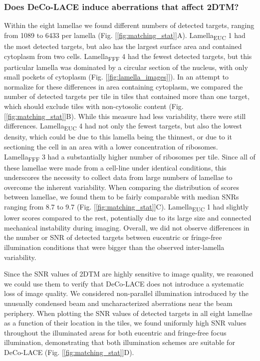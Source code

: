 \documentclass[
]{article}
\begin{document}
\hypertarget{does-deco-lace-induce-aberrations-that-affect-2dtm}{%
\subsubsection{Does DeCo-LACE induce aberrations that affect 2DTM?}\label{does-deco-lace-induce-aberrations-that-affect-2dtm}}

Within the eight lamellae we found different numbers of detected
targets, ranging from 1089 to 6433 per lamella (Fig.
{[}\ref{fig:matching_stat}{]}A). Lamella\textsubscript{EUC} 1 had the most detected targets,
but also has the largest surface area and contained cytoplasm from two
cells. Lamella\textsubscript{FFF} 4 had the fewest detected targets, but this
particular lamella was dominated by a circular section of the nucleus,
with only small pockets of cytoplasm (Fig. {[}\ref{fig:lamella_images}{]}). In an
attempt to normalize for these differences in area containing cytoplasm,
we compared the number of detected targets per tile in tiles that
contained more than one target, which should exclude tiles with
non-cytosolic content (Fig. {[}\ref{fig:matching_stat}{]}B). While this measure
had less variability, there were still differences. Lamella\textsubscript{EUC} 4 had
not only the fewest targets, but also the lowest density, which could be
due to this lamella being the thinnest, or due to it sectioning the cell
in an area with a lower concentration of ribosomes. Lamella\textsubscript{FFF} 3 had a
substantially higher number of ribosomes per tile. Since all of these
lamellae were made from a cell-line under identical conditions, this
underscores the necessity to collect data from large numbers of lamellae
to overcome the inherent variability. When comparing the distribution of
scores between lamellae, we found them to be fairly comparable with
median SNRs ranging from 8.7 to 9.7 (Fig. {[}\ref{fig:matching_stat}{]}C).
Lamella\textsubscript{EUC} 1 had slightly lower scores compared to the rest,
potentially due to its large size and connected mechanical instability
during imaging. Overall, we did not observe differences in the number or
SNR of detected targets between eucentric or fringe-free illumination
conditions that were bigger than the observed inter-lamella variability.

Since the SNR values of 2DTM are highly sensitive to image quality, we
reasoned we could use them to verify that DeCo-LACE does not introduce a
systematic loss of image quality. We considered non-parallel
illumination introduced by the unusually condensed beam and
uncharacterized aberrations near the beam periphery. When plotting the
SNR values of detected targets in all eight lamellae as a function of
their location in the tiles, we found uniformly high SNR values
throughout the illuminated areas for both eucentric and fringe-free
focus illumination, demonstrating that both illumination schemes are
suitable for DeCo-LACE (Fig. {[}\ref{fig:matching_stat}{]}D).
\end{document}
